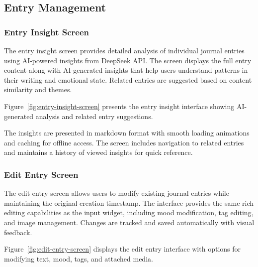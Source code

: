 \subsection{Entry Management}

\subsubsection{Entry Insight Screen}

The entry insight screen provides detailed analysis of individual journal entries using AI-powered insights from DeepSeek API. The screen displays the full entry content along with AI-generated insights that help users understand patterns in their writing and emotional state. Related entries are suggested based on content similarity and themes.

Figure~\ref{fig:entry-insight-screen} presents the entry insight interface showing AI-generated analysis and related entry suggestions.


The insights are presented in markdown format with smooth loading animations and caching for offline access. The screen includes navigation to related entries and maintains a history of viewed insights for quick reference.

\subsubsection{Edit Entry Screen}

The edit entry screen allows users to modify existing journal entries while maintaining the original creation timestamp. The interface provides the same rich editing capabilities as the input widget, including mood modification, tag editing, and image management. Changes are tracked and saved automatically with visual feedback.

Figure~\ref{fig:edit-entry-screen} displays the edit entry interface with options for modifying text, mood, tags, and attached media.


